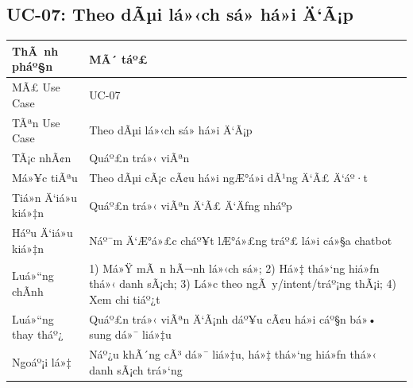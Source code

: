 ﻿\documentclass[12pt,a4paper]{report}
\begin{document}
\subsection{UC-07: Theo dÃµi lá»‹ch sá»­ há»i Ä‘Ã¡p}
\begin{table}[H]
\centering
\begin{tabular}{|p{3.5cm}|p{8.5cm}|}
\hline
\textbf{ThÃ nh pháº§n} & \textbf{MÃ´ táº£} \\ \hline
MÃ£ Use Case & UC-07 \\ \hline
TÃªn Use Case & Theo dÃµi lá»‹ch sá»­ há»i Ä‘Ã¡p \\ \hline
TÃ¡c nhÃ¢n & Quáº£n trá»‹ viÃªn \\ \hline
Má»¥c tiÃªu & Theo dÃµi cÃ¡c cÃ¢u há»i ngÆ°á»i dÃ¹ng Ä‘Ã£ Ä‘áº·t \\ \hline
Tiá»n Ä‘iá»u kiá»‡n & Quáº£n trá»‹ viÃªn Ä‘Ã£ Ä‘Äƒng nháº­p \\ \hline
Háº­u Ä‘iá»u kiá»‡n & Náº¯m Ä‘Æ°á»£c cháº¥t lÆ°á»£ng tráº£ lá»i cá»§a chatbot \\ \hline
Luá»“ng chÃ­nh & 1) Má»Ÿ mÃ n hÃ¬nh lá»‹ch sá»­; 2) Há»‡ thá»‘ng hiá»ƒn thá»‹ danh sÃ¡ch; 3) Lá»c theo ngÃ y/intent/tráº¡ng thÃ¡i; 4) Xem chi tiáº¿t \\ \hline
Luá»“ng thay tháº¿ & Quáº£n trá»‹ viÃªn Ä‘Ã¡nh dáº¥u cÃ¢u há»i cáº§n bá»• sung dá»¯ liá»‡u \\ \hline
Ngoáº¡i lá»‡ & Náº¿u khÃ´ng cÃ³ dá»¯ liá»‡u, há»‡ thá»‘ng hiá»ƒn thá»‹ danh sÃ¡ch trá»‘ng \\ \hline
\end{tabular}
\end{table}
\end{document}
